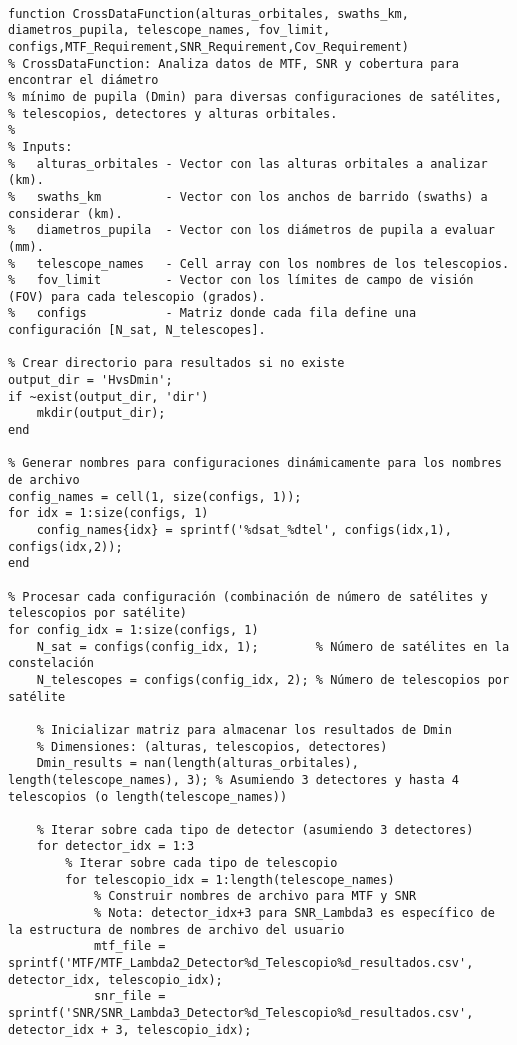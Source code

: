 \begin{verbatim}

function CrossDataFunction(alturas_orbitales, swaths_km, diametros_pupila, telescope_names, fov_limit, configs,MTF_Requirement,SNR_Requirement,Cov_Requirement)
% CrossDataFunction: Analiza datos de MTF, SNR y cobertura para encontrar el diámetro
% mínimo de pupila (Dmin) para diversas configuraciones de satélites,
% telescopios, detectores y alturas orbitales.
%
% Inputs:
%   alturas_orbitales - Vector con las alturas orbitales a analizar (km).
%   swaths_km         - Vector con los anchos de barrido (swaths) a considerar (km).
%   diametros_pupila  - Vector con los diámetros de pupila a evaluar (mm).
%   telescope_names   - Cell array con los nombres de los telescopios.
%   fov_limit         - Vector con los límites de campo de visión (FOV) para cada telescopio (grados).
%   configs           - Matriz donde cada fila define una configuración [N_sat, N_telescopes].

% Crear directorio para resultados si no existe
output_dir = 'HvsDmin';
if ~exist(output_dir, 'dir')
    mkdir(output_dir);
end

% Generar nombres para configuraciones dinámicamente para los nombres de archivo
config_names = cell(1, size(configs, 1));
for idx = 1:size(configs, 1)
    config_names{idx} = sprintf('%dsat_%dtel', configs(idx,1), configs(idx,2));
end

% Procesar cada configuración (combinación de número de satélites y telescopios por satélite)
for config_idx = 1:size(configs, 1)
    N_sat = configs(config_idx, 1);        % Número de satélites en la constelación
    N_telescopes = configs(config_idx, 2); % Número de telescopios por satélite

    % Inicializar matriz para almacenar los resultados de Dmin
    % Dimensiones: (alturas, telescopios, detectores)
    Dmin_results = nan(length(alturas_orbitales), length(telescope_names), 3); % Asumiendo 3 detectores y hasta 4 telescopios (o length(telescope_names))

    % Iterar sobre cada tipo de detector (asumiendo 3 detectores)
    for detector_idx = 1:3
        % Iterar sobre cada tipo de telescopio
        for telescopio_idx = 1:length(telescope_names)
            % Construir nombres de archivo para MTF y SNR
            % Nota: detector_idx+3 para SNR_Lambda3 es específico de la estructura de nombres de archivo del usuario
            mtf_file = sprintf('MTF/MTF_Lambda2_Detector%d_Telescopio%d_resultados.csv', detector_idx, telescopio_idx);
            snr_file = sprintf('SNR/SNR_Lambda3_Detector%d_Telescopio%d_resultados.csv', detector_idx + 3, telescopio_idx);


\end{verbatim}
